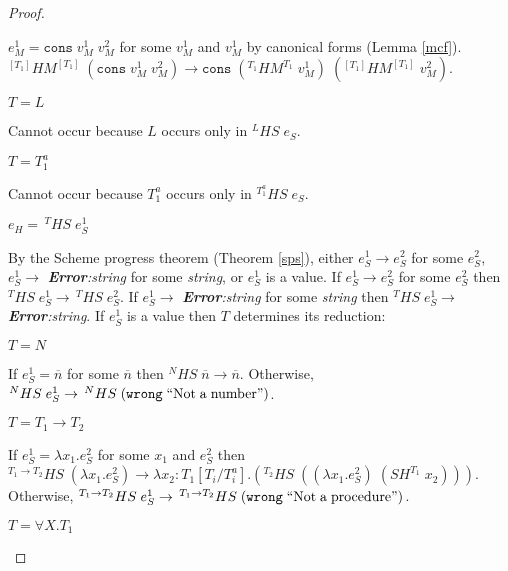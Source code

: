 \begin{hps}
\begin{proof}
\begin{hps-case-13}
\begin{hps-case-13-4}
$e_{M}^{1}=\mathtt{cons}\;v_{M}^{1}\;v_{M}^{2}$ for some $v_{M}^{1}$ and $v_{M}^{1}$ by canonical forms (Lemma \ref{mcf}).  $^{[T_{1}]}HM^{[T_{1}]}\;(\mathtt{cons}\;v_{M}^{1}\;v_{M}^{2})\rightarrow\mathtt{cons}\;(^{T_{1}}HM^{T_{1}}\;v_{M}^{1})\;(^{[T_{1}]}HM^{[T_{1}]}\;v_{M}^{2})$.
\end{hps-case-13-4}
\begin{hps-case-13-5}
$T=L$

Cannot occur because $L$ occurs only in $^{L}HS\;e_{S}$.
\end{hps-case-13-5}
\begin{hps-case-13-6}
$T=T_{1}^{a}$

Cannot occur because $T_{1}^{a}$ occurs only in $^{T_{1}^{a}}HS\;e_{S}$.
\end{hps-case-13-6}
\end{hps-case-13}
\begin{hps-case-14}
$e_{H}=\,^{T}HS\;e_{S}^{1}$

By the Scheme progress theorem (Theorem \ref{sps}), either $e_{S}^{1}\rightarrow e_{S}^{2}$ for some $e_{S}^{2}$, $e_{S}^{1}\rightarrow$ \emph{\textbf{Error}:\;string} for some \emph{string}, or $e_{S}^{1}$ is a value.  If $e_{S}^{1}\rightarrow e_{S}^{2}$ for some $e_{S}^{2}$ then $^{T}HS\;e_{S}^{1}\rightarrow\,^{T}HS\;e_{S}^{2}$.  If $e_{S}^{1}\rightarrow$ \emph{\textbf{Error}:\;string} for some \emph{string} then $^{T}HS\;e_{S}^{1}\rightarrow$ \emph{\textbf{Error}:\;string}.  If $e_{S}^{1}$ is a value then $T$ determines its reduction:
\begin{hps-case-14-1}
$T=N$

If $e_{S}^{1}=\overline{n}$ for some $\overline{n}$ then $^{N}HS\;\overline{n}\rightarrow\overline{n}$.  Otherwise, $^{N}HS\;e_{S}^{1}\rightarrow\,^{N}HS\;(\mathtt{wrong}\;\mathrm{``Not\;a\;number"})$.
\end{hps-case-14-1}
\begin{hps-case-14-2}
$T=T_{1}\rightarrow T_{2}$

If $e_{S}^{1}=\lambda x_{1}.e_{S}^{2}$ for some $x_{1}$ and $e_{S}^{2}$ then $^{T_{1}\rightarrow T_{2}}HS\;(\lambda x_{1}.e_{S}^{2})\rightarrow\lambda x_{2}:T_{1}[T_{i}/T^{a}_{i}].(^{T_{2}}HS\;((\lambda x_{1}.e_{S}^{2})\;(SH^{T_{1}}\;x_{2})))$.  Otherwise, $^{T_{1}\rightarrow T_{2}}HS\;e_{S}^{1}\rightarrow\,^{T_{1}\rightarrow T_{2}}HS\;(\mathtt{wrong}\;\mathrm{``Not\;a\;procedure"})$.
\end{hps-case-14-2}
\begin{hps-case-14-3}
$T=\forall X.T_{1}$


\end{hps-case-14-3}
\end{hps-case-14}
\end{proof}
\end{hps}
